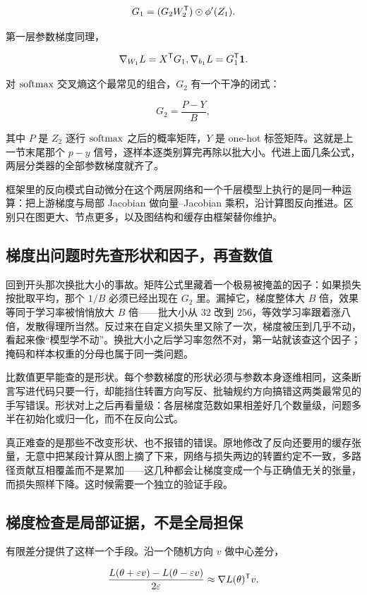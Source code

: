\[
G_1
=(G_2W_2^{\mathsf{T}})\odot\phi'(Z_1).
\]

第一层参数梯度同理，

\[
\nabla_{W_1}L=X^{\mathsf{T}} G_1,\space
\nabla_{b_1}L=G_1^{\mathsf{T}}\mathbf1 .
\]

对 \(\operatorname{softmax}\) 交叉熵这个最常见的组合，\(G_2\) 有一个干净的闭式：

\[
G_2=\frac{P-Y}{B},
\]

其中 \(P\) 是 \(Z_2\) 逐行 \(\operatorname{softmax}\) 之后的概率矩阵，\(Y\) 是 one-hot 标签矩阵。这就是上一节末尾那个 \(p-y\) 信号，逐样本逐类别算完再除以批大小。代进上面几条公式，两层分类器的全部参数梯度就齐了。

框架里的反向模式自动微分在这个两层网络和一个千层模型上执行的是同一种运算：把上游梯度与局部 Jacobian 做向量--Jacobian 乘积，沿计算图反向推进。区别只在图更大、节点更多，以及图结构和缓存由框架替你维护。

\subsection{梯度出问题时先查形状和因子，再查数值}

回到开头那次换批大小的事故。矩阵公式里藏着一个极易被掩盖的因子：如果损失按批取平均，那个 \(1/B\) 必须已经出现在 \(G_2\) 里。漏掉它，梯度整体大 \(B\) 倍，效果等同于学习率被悄悄放大 \(B\) 倍——批大小从 \(32\) 改到 \(256\)，等效学习率跟着涨八倍，发散得理所当然。反过来在自定义损失里又除了一次，梯度被压到几乎不动，看起来像``模型学不动''。换批大小之后学习率忽然不对，第一站就该查这个因子；掩码和样本权重的分母也属于同一类问题。

比数值更早能查的是形状。每个参数梯度的形状必须与参数本身逐维相同，这条断言写进代码只要一行，却能挡住转置方向写反、批轴规约方向搞错这两类最常见的手写错误。形状对上之后再看量级：各层梯度范数如果相差好几个数量级，问题多半在初始化或归一化，而不在反向公式。

真正难查的是那些不改变形状、也不报错的错误。原地修改了反向还要用的缓存张量，无意中把某段计算从图上摘了下来，网络与损失两边的转置约定不一致，多路径贡献互相覆盖而不是累加——这几种都会让梯度变成一个与正确值无关的张量，而损失照样下降。这时候需要一个独立的验证手段。

\subsection{梯度检查是局部证据，不是全局担保}

有限差分提供了这样一个手段。沿一个随机方向 \(v\) 做中心差分，

\[
\frac{L(\theta+\varepsilon v)-L(\theta-\varepsilon v)}{2\varepsilon}
\approx
\nabla L(\theta)^{\mathsf{T}} v .
\]

